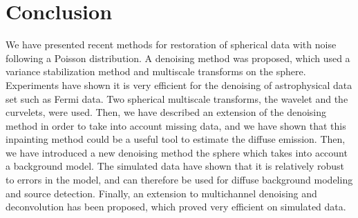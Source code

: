 \chapter{Conclusion}
\label{ch_conclusion}


We have presented recent methods for restoration of spherical data with noise following a Poisson distribution. A denoising method was proposed, which used a variance stabilization method and multiscale transforms on the sphere.
Experiments have shown it is very efficient for the denoising of  astrophysical data set such as Fermi data.  Two spherical multiscale transforms, the wavelet and the curvelets, were used.
Then, we have described an extension of the denoising method in order to take into account missing data, and we have shown that this inpainting method
could be a useful tool to estimate the diffuse emission. 
Then, we have introduced a new denoising method the sphere which takes into account a background model. The simulated data have shown that it is relatively robust to
errors in the model, and can therefore be used for diffuse background modeling and source detection.
Finally, an extension to multichannel denoising and deconvolution has been proposed, which proved very efficient on simulated data.
